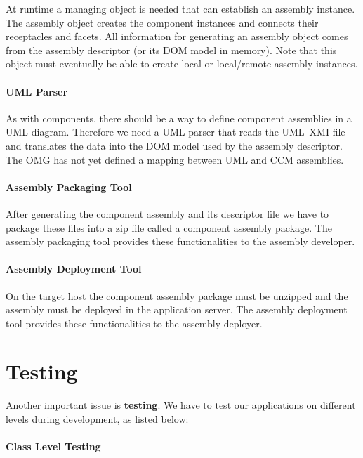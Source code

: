 At runtime a managing object is needed that can establish an assembly instance.
The assembly object creates the component instances and connects their
receptacles and facets. All information for generating an assembly object comes
from the assembly descriptor (or its DOM model in memory). Note that this object
must eventually be able to create local or local/remote assembly instances.

\paragraph{UML Parser}

As with components, there should be a way to define component assemblies in a
UML diagram. Therefore we need a UML parser that reads the UML--XMI file and
translates the data into the DOM model used by the assembly descriptor. The OMG
has not yet defined a mapping between UML and CCM assemblies.

\paragraph{Assembly Packaging Tool}

After generating the component assembly and its descriptor file we have to
package these files into a zip file called a component assembly package. The
assembly packaging tool provides these functionalities to the assembly
developer.

\paragraph{Assembly Deployment Tool}

On the target host the component assembly package must be unzipped and the
assembly must be deployed in the application server. The assembly deployment
tool provides these functionalities to the assembly deployer.

\section{Testing}

Another important issue is {\bf testing}. We have to test our applications on
different levels during development, as listed below:

\paragraph{Class Level Testing}

